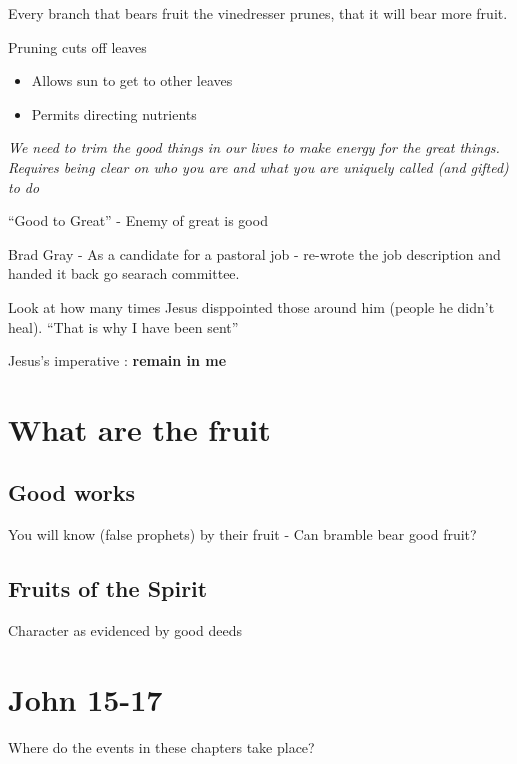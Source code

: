 \documentclass[
]{book}
\providecommand{\tightlist}{%
  \setlength{\itemsep}{0pt}\setlength{\parskip}{0pt}}
\begin{document}
Every branch that bears fruit the vinedresser prunes, that it will bear more fruit.

Pruning cuts off leaves

\begin{itemize}
\tightlist
\item
  Allows sun to get to other leaves
\item
  Permits directing nutrients
\end{itemize}

\emph{We need to trim the good things in our lives to make energy for the great things. Requires being clear on who you are and what you are uniquely called (and gifted) to do}

``Good to Great'' - Enemy of great is good

Brad Gray - As a candidate for a pastoral job - re-wrote the job description and handed it back go searach committee.

Look at how many times Jesus disppointed those around him (people he didn't heal). ``That is why I have been sent''

Jesus's imperative : \textbf{remain in me}

\hypertarget{what-are-the-fruit}{%
\section{What are the fruit}\label{what-are-the-fruit}}

\hypertarget{good-works}{%
\subsection{Good works}\label{good-works}}

You will know (false prophets) by their fruit - Can bramble bear good fruit?

\hypertarget{fruits-of-the-spirit}{%
\subsection{Fruits of the Spirit}\label{fruits-of-the-spirit}}

Character as evidenced by good deeds

\hypertarget{john-15-17}{%
\section{John 15-17}\label{john-15-17}}

Where do the events in these chapters take place?
\end{document}
